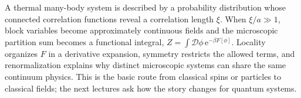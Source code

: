 \documentclass[11pt]{article}
\newcommand{\e}{\mathrm{e}}
\newcommand{\cD}{\mathcal{D}}
\begin{document}
A thermal many-body system is described by a probability distribution whose connected correlation functions reveal a correlation length $\xi$.  When $\xi/a\gg1$, block variables become approximately continuous fields and the microscopic partition sum becomes a functional integral, $Z=\int\cD\phi\,\e^{-\beta F[\phi]}$.  Locality organizes $F$ in a derivative expansion, symmetry restricts the allowed terms, and renormalization explains why distinct microscopic systems can share the same continuum physics.  This is the basic route from classical spins or particles to classical fields; the next lectures ask how the story changes for quantum systems.
\end{document}
